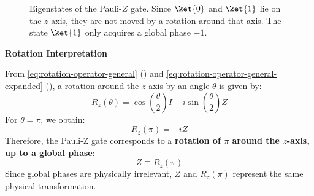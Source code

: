 \begin{figure}[!htp]
    \centering
    \caption{Eigenstates of the Pauli-$Z$ gate. Since $\ket{0}$ and $\ket{1}$ lie on the $z$-axis, they are not moved by a rotation around that axis. The state $\ket{1}$ only acquires a global phase $-1$.}
    \label{fig:pauli-z-eigenstates}
\end{figure}

\highspace
\begin{flushleft}
    \textcolor{Green3}{ \textbf{Rotation Interpretation}}
\end{flushleft}
From \autoref{eq:rotation-operator-general} () and \autoref{eq:rotation-operator-general-expanded} (), a rotation around the $z$-axis by an angle $\theta$ is given by:
\begin{equation*}
    R_z(\theta) = \cos\left(\frac{\theta}{2}\right) I - i \sin\left(\frac{\theta}{2}\right) Z
\end{equation*}
For $\theta = \pi$, we obtain:
\begin{equation*}
    R_z(\pi) = -iZ
\end{equation*}
Therefore, the Pauli-Z gate corresponds to a \textbf{rotation of $\pi$ around the $z$-axis, up to a global phase}:
\begin{equation*}
    Z \equiv R_z(\pi)
\end{equation*}
Since global phases are physically irrelevant, $Z$ and $R_z(\pi)$ represent the same physical transformation.

